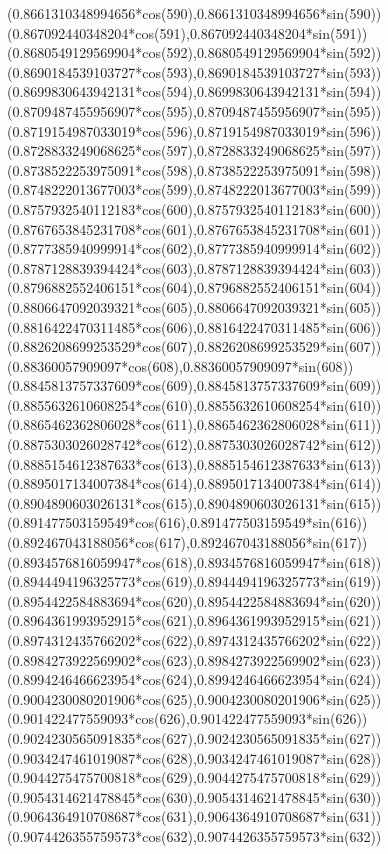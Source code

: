 {({0.8661310348994656*cos(590)},{0.8661310348994656*sin(590)})
({0.867092440348204*cos(591)},{0.867092440348204*sin(591)})
({0.8680549129569904*cos(592)},{0.8680549129569904*sin(592)})
({0.8690184539103727*cos(593)},{0.8690184539103727*sin(593)})
({0.8699830643942131*cos(594)},{0.8699830643942131*sin(594)})
({0.8709487455956907*cos(595)},{0.8709487455956907*sin(595)})
({0.8719154987033019*cos(596)},{0.8719154987033019*sin(596)})
({0.8728833249068625*cos(597)},{0.8728833249068625*sin(597)})
({0.8738522253975091*cos(598)},{0.8738522253975091*sin(598)})
({0.8748222013677003*cos(599)},{0.8748222013677003*sin(599)})
({0.8757932540112183*cos(600)},{0.8757932540112183*sin(600)})
({0.8767653845231708*cos(601)},{0.8767653845231708*sin(601)})
({0.8777385940999914*cos(602)},{0.8777385940999914*sin(602)})
({0.8787128839394424*cos(603)},{0.8787128839394424*sin(603)})
({0.8796882552406151*cos(604)},{0.8796882552406151*sin(604)})
({0.8806647092039321*cos(605)},{0.8806647092039321*sin(605)})
({0.8816422470311485*cos(606)},{0.8816422470311485*sin(606)})
({0.8826208699253529*cos(607)},{0.8826208699253529*sin(607)})
({0.88360057909097*cos(608)},{0.88360057909097*sin(608)})
({0.8845813757337609*cos(609)},{0.8845813757337609*sin(609)})
({0.8855632610608254*cos(610)},{0.8855632610608254*sin(610)})
({0.8865462362806028*cos(611)},{0.8865462362806028*sin(611)})
({0.8875303026028742*cos(612)},{0.8875303026028742*sin(612)})
({0.8885154612387633*cos(613)},{0.8885154612387633*sin(613)})
({0.8895017134007384*cos(614)},{0.8895017134007384*sin(614)})
({0.8904890603026131*cos(615)},{0.8904890603026131*sin(615)})
({0.891477503159549*cos(616)},{0.891477503159549*sin(616)})
({0.892467043188056*cos(617)},{0.892467043188056*sin(617)})
({0.8934576816059947*cos(618)},{0.8934576816059947*sin(618)})
({0.8944494196325773*cos(619)},{0.8944494196325773*sin(619)})
({0.8954422584883694*cos(620)},{0.8954422584883694*sin(620)})
({0.8964361993952915*cos(621)},{0.8964361993952915*sin(621)})
({0.8974312435766202*cos(622)},{0.8974312435766202*sin(622)})
({0.8984273922569902*cos(623)},{0.8984273922569902*sin(623)})
({0.8994246466623954*cos(624)},{0.8994246466623954*sin(624)})
({0.9004230080201906*cos(625)},{0.9004230080201906*sin(625)})
({0.901422477559093*cos(626)},{0.901422477559093*sin(626)})
({0.9024230565091835*cos(627)},{0.9024230565091835*sin(627)})
({0.9034247461019087*cos(628)},{0.9034247461019087*sin(628)})
({0.9044275475700818*cos(629)},{0.9044275475700818*sin(629)})
({0.9054314621478845*cos(630)},{0.9054314621478845*sin(630)})
({0.9064364910708687*cos(631)},{0.9064364910708687*sin(631)})
({0.9074426355759573*cos(632)},{0.9074426355759573*sin(632)})
}
